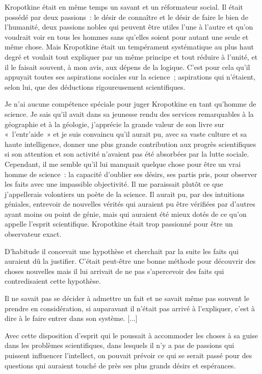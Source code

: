 \documentclass[french,twoside]{book} %
\begin{document}
Kropotkine était en même temps un savant et un réformateur social. Il était possédé par deux passions : le désir de connaître et le désir de faire le bien de l’humanité, deux passions nobles qui peuvent être utiles l’une à l’autre et qu’on voudrait voir en tous les hommes sans qu’elles soient pour autant une seule et même chose. Mais Kropotkine était un tempérament systématique au plus haut degré et voulait tout expliquer par un même principe et tout réduire à l’unité, et il le faisait souvent, à mon avis, aux dépens de la logique. C'est pour cela qu’il appuyait toutes ses aspirations sociales sur la science ; aspirations qui n’étaient, selon lui, que des déductions rigoureusement scientifiques.\par
Je n’ai aucune compétence spéciale pour juger Kropotkine en tant qu’homme de science. Je sais qu’il avait dans sa jeunesse rendu des services remarquables à la géographie et à la géologie, j’apprécie la grande valeur de son livre sur « l’entr'aide » et je suis convaincu qu’il aurait pu, avec sa vaste culture et sa haute intelligence, donner une plus grande contribution aux progrès scientifiques si son attention et son activité n’avaient pas été absorbées par la lutte sociale. Cependant, il me semble qu’il lui manquait quelque chose pour être un vrai homme de science : la capacité d’oublier ses désirs, ses partis pris, pour observer les faits avec une impassible objectivité. Il me paraissait plutôt ce que j’appellerais volontiers un poète de la science. Il aurait pu, par des intuitions géniales, entrevoir de nouvelles vérités qui auraient pu être vérifiées par d’autres ayant moins ou point de génie, mais qui auraient été mieux dotés de ce qu’on appelle l’esprit scientifique. Kropotkine était trop passionné pour être un observateur exact.\par
D'habitude il concevait une hypothèse et cherchait par la suite les faits qui auraient dû la justifier. C'était peut-être une bonne méthode pour découvrir des choses nouvelles mais il lui arrivait de ne pas s’apercevoir des faits qui contredisaient cette hypothèse.\par
Il ne savait pas se décider à admettre un fait et ne savait même pas souvent le prendre en considération, si auparavant il n’était pas arrivé à l’expliquer, c’est à dire à le faire entrer dans son système. [...]\par
Avec cette disposition d’esprit qui le poussait à accommoder les choses à sa guise dans les problèmes scientifiques, dans lesquels il n’y a pas de passions qui puissent influencer l’intellect, on pouvait prévoir ce qui se serait passé pour des questions qui auraient touché de près ses plus grands désirs et espérances.\par
\end{document}
